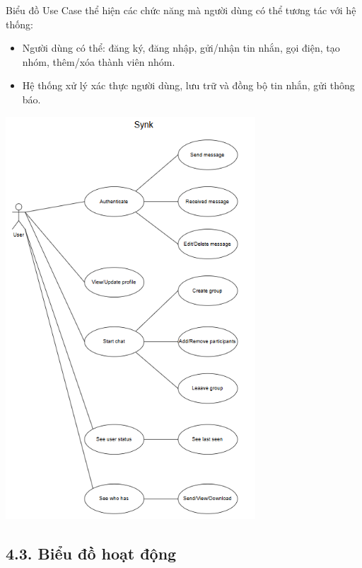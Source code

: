 \documentclass[12pt,a4paper]{article}
\begin{document}
	\noindent
	Biểu đồ Use Case thể hiện các chức năng mà người dùng có thể tương tác với hệ thống:
	\begin{itemize}
		\item Người dùng có thể: đăng ký, đăng nhập, gửi/nhận tin nhắn, gọi điện, tạo nhóm, thêm/xóa thành viên nhóm.
		\item Hệ thống xử lý xác thực người dùng, lưu trữ và đồng bộ tin nhắn, gửi thông báo.
	\end{itemize}
	\includegraphics[width=0.7\textwidth]{usecase.png}\\[0.5cm]
	
	\vspace{0.7cm}
	
	\subsection*{4.3. Biểu đồ hoạt động}
	\vspace{0.1cm}
	
\end{document}

